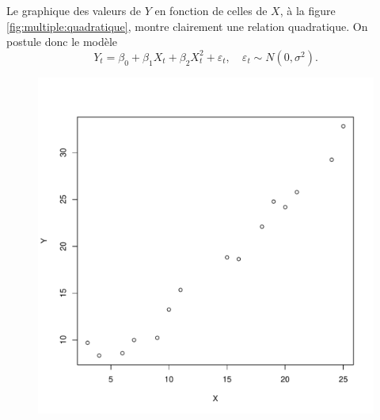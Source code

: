 \begin{solution}{3.16}
    Le graphique des valeurs de $Y$ en fonction de celles de $X$, à la
    figure \ref{fig:multiple:quadratique}, montre clairement une
    relation quadratique. On postule donc le modèle
    \begin{displaymath}
      Y_t = \beta_0 + \beta_1 X_t + \beta_2 X_t^2 + \varepsilon_t, \quad
      \varepsilon_t \sim N(0, \sigma^2).
    \end{displaymath}
    \begin{figure}
      \centering
\begin{knitrout}
\color{fgcolor}\begin{kframe}
\begin{alltt}
 \hlopt{~}   
\end{alltt}
\end{kframe}
\includegraphics[width=\maxwidth]{figure/unnamed-chunk-39-1}


\end{knitrout}
\end{figure}
\end{solution}
